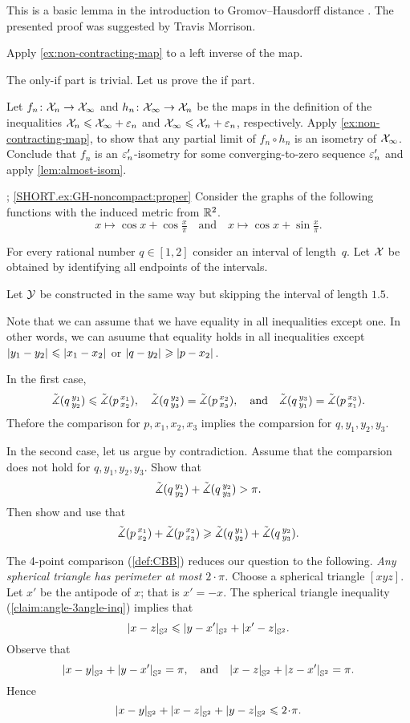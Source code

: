 This is a basic lemma in the introduction to Gromov--Hausdorff distance \cite[see 7.3.30 in][]{burago-burago-ivanov}.
The presented proof was suggested by Travis Morrison.

Apply \ref{ex:non-contracting-map} to a left inverse of the map.

The only-if part is trivial.
Let us prove the if part.

Let $f_n\colon\mathcal{X}_n\to \mathcal{X}_\infty$ and $h_n\colon\mathcal{X}_\infty\to \mathcal{X}_n$ be the maps in the definition of the inequalities $\mathcal{X}_n\leqslant \mathcal{X}_\infty+\varepsilon_n$ and $\mathcal{X}_\infty\leqslant \mathcal{X}_n+\varepsilon_n$, respectively.
Apply \ref{ex:non-contracting-map}, to show that any partial limit of $f_n\circ h_n$ is an isometry of $\mathcal{X}_\infty$.
Conclude that $f_n$ is an $\varepsilon_n'$-isometry for some converging-to-zero sequence $\varepsilon_n'$ and apply \ref{lem:almost-isom}.

\parbf{\ref{ex:GH-noncompact}}; \ref{SHORT.ex:GH-noncompact:proper}
 Consider the graphs of the following functions with the induced metric from $\mathbb{R}^2$.
\[
x\mapsto \cos x+\cos \tfrac x\pi
\quad\text{and}\quad
x\mapsto \cos x+\sin \tfrac x\pi.
\]


\parit{\ref{SHORT.ex:GH-noncompact:bounded}}
For every rational number  $q\in[1,2]$ consider an interval of length~$q$.
Let $\mathcal{X}$ be obtained by identifying all endpoints of the intervals.

Let $\mathcal{Y}$ be constructed in the same way but skipping the interval of length $1.5$.

 Note that we can assume that we have equality in all inequalities except one.
In other words, we can asuume that equality holds in all inequalities except $|{y_1}-{y_2}|_{}^{{}}\leqslant|{x_1}-{x_2}|_{}^{{}}$ or $|{q}-{y_2}|_{}^{{}}\geqslant|{p}-{x_2}|_{}^{{}}$.

In the first case,
\[
\tilde\measuredangle(q\,{}^{y_1}_{y_2})\leqslant \tilde\measuredangle(p\,{}^{x_1}_{x_2}),
\quad
\tilde\measuredangle(q\,{}^{y_2}_{y_3})= \tilde\measuredangle(p\,{}^{x_2}_{x_3}),
\quad
\text{and}
\quad
\tilde\measuredangle(q\,{}^{y_3}_{y_1})= \tilde\measuredangle(p\,{}^{x_3}_{x_1}).
\]
Thefore the comparison for $p,x_1,x_2,x_3$ implies the comparsion for $q,y_1,y_2,y_3$.

In the second case, let us argue by contradiction.
Assume that the comparsion does not hold for $q,y_1,y_2,y_3$.
Show that
\[\tilde\measuredangle(q\,{}^{y_1}_{y_2})+\tilde\measuredangle(q\,{}^{y_2}_{y_3})> \pi.\]
Then show and use that
\[\tilde\measuredangle(p\,{}^{x_1}_{x_2})+\tilde\measuredangle(p\,{}^{x_2}_{x_3})\geqslant\tilde\measuredangle(q\,{}^{y_1}_{y_2})+\tilde\measuredangle(q\,{}^{y_2}_{y_3}).\]


The 4-point comparison (\ref{def:CBB}) reduces our question to the following.
\textit{Any spherical triangle has perimeter at most $2\cdot\pi$.}
Choose a spherical triangle $[xyz]$.
Let $x'$ be the antipode of $x$; that is $x'=-x$.
The spherical triangle inequality (\ref{claim:angle-3angle-inq}) implies that
\[|{x}-{z}|_{\mathbb{S}^2}^{{}}\leqslant |{y}-{x'}|_{\mathbb{S}^2}^{{}}+|{x'}-{z}|_{\mathbb{S}^2}^{{}}.\]
Observe that 
\[
|{x}-{y}|_{\mathbb{S}^2}^{{}}+|{y}-{x'}|_{\mathbb{S}^2}^{{}}=\pi,
\quad\text{and}\quad
|{x}-{z}|_{\mathbb{S}^2}^{{}}+|{z}-{x'}|_{\mathbb{S}^2}^{{}}=\pi.
\]
Hence
\[\dist{x}{y}{\mathbb{S}^2}+\dist{x}{z}{\mathbb{S}^2}+\dist{y}{z}{\mathbb{S}^2}\le2\cdot \pi.\]


